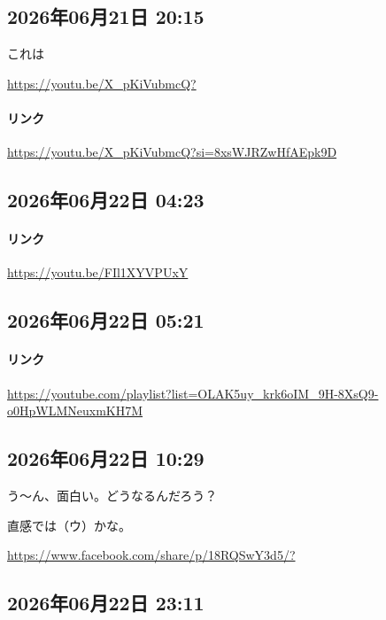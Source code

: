 \subsection*{2026年06月21日 20:15}

これは

\url{https://youtu.be/X_pKiVubmcQ?}

\paragraph{リンク}
\url{https://youtu.be/X_pKiVubmcQ?si=8xsWJRZwHfAEpk9D}

\subsection*{2026年06月22日 04:23}

\paragraph{リンク}
\url{https://youtu.be/FIl1XYVPUxY}

\subsection*{2026年06月22日 05:21}

\paragraph{リンク}
\url{https://youtube.com/playlist?list=OLAK5uy_krk6oIM_9H-8XsQ9-o0HpWLMNeuxmKH7M}

\subsection*{2026年06月22日 10:29}

う〜ん、面白い。どうなるんだろう？

直感では（ウ）かな。

\url{https://www.facebook.com/share/p/18RQSwY3d5/?}

\subsection*{2026年06月22日 23:11}

